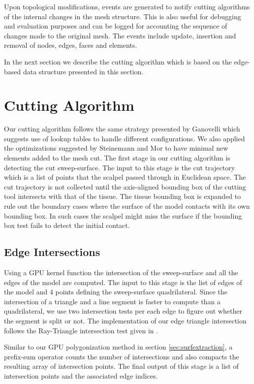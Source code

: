 Upon topological modifications, events are generated to notify cutting algorithms of the internal changes in the mesh structure. 
This is also useful for debugging and evaluation purposes and can be logged for accounting the sequence of changes made to the 
original mesh. The events include update, insertion and removal of nodes, edges, faces and elements.


In the next section we describe the cutting algorithm which is based on the edge-based data structure presented in this section.

\section{Cutting Algorithm}
\label{sec:cutalg}
Our cutting algorithm follows the same strategy presented by Ganovelli \etal \cite{Ganovelli2000} which suggests use of lookup tables to 
handle different configurations. We also applied the optimizations suggested by
Steinemann and Mor \etal \cite{Steinemann, Mor2000} to have minimal new elements added to the mesh cut. 
The first stage in our cutting algorithm is detecting the cut sweep-surface. The input to this stage is the cut trajectory which is a list of points
that the scalpel passed through in Euclidean space. The cut trajectory is not collected until the axis-aligned bounding box of the cutting tool intersects
with that of the tissue. The tissue bounding box is expanded to rule out the boundary cases where the surface of the model contacts with its own bounding 
box. In such cases the scalpel might miss the surface if the bounding box test fails to detect the initial contact. 


\subsection{Edge Intersections}
\label{sec:CuttingEdgeIntersections}
Using a GPU kernel function the intersection of the sweep-surface and all the edges of the model are computed. 
The input to this stage is the list of edges of the model and 4 points defining the sweep-surface quadrilateral. 
Since the intersection of a triangle and a line segment is faster to compute than a quadrilateral, we 
use two intersection tests per each edge to figure out whether the segment is split or not. The implementation
of our edge triangle intersection follows the Ray-Triangle intersection test given in \cite{RTR3}.


Similar to our GPU polygonization method in section \ref{sec:surfextraction}, a prefix-sum operator counts the number
of intersections and also compacts the resulting array of intersection points. The final output of this stage is a list
of intersection points and the associated edge indices. 
		     
